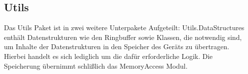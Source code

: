 \subsection{Utils} \label{module:utils}
Das Utils Paket ist in zwei weitere Unterpakete Aufgeteilt: Utils.DataStructures enthält Datenstrukturen wie den Ringbuffer sowie Klassen, die notwendig sind, um Inhalte der Datenstrukturen in den Speicher des Geräts zu übertragen. Hierbei handelt es sich lediglich um die dafür erforderliche Logik. Die Speicherung übernimmt schlißlich das MemoryAccess Modul.